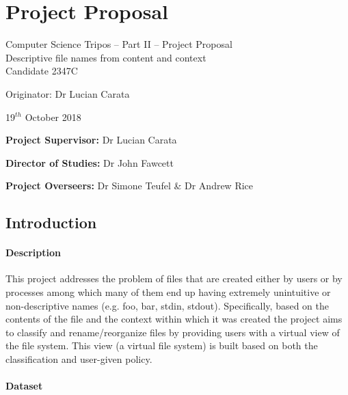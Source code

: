 


\chapter{Project Proposal}
\begin{center}
  \Large
  Computer Science Tripos -- Part II -- Project Proposal\\[4mm]
  \LARGE
  Descriptive file names from content and context \\[4mm]

  \large
  Candidate 2347C

  Originator: Dr Lucian Carata

  19$^{th}$ October 2018
\end{center}

\vspace{5mm}

\textbf{Project Supervisor:} Dr Lucian Carata

\textbf{Director of Studies:} Dr John Fawcett

\textbf{Project Overseers:} Dr Simone Teufel  \& Dr Andrew Rice


\section*{Introduction}

\subsubsection*{Description}

This project addresses the problem of files that are created either by users or by processes among which many of them end up having extremely unintuitive or non-descriptive names (e.g. foo, bar, stdin, stdout). Specifically, based on the contents of the file and the context within which it was created the project aims to classify and rename/reorganize files by providing users with a virtual view of the file system. This view (a virtual file system) is built based on both the classification and user-given policy.

\subsubsection*{Dataset}

